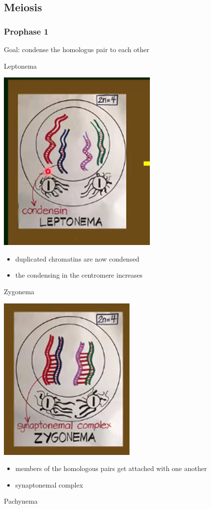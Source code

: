 \documentclass{article}
\begin{document}
\subsection*{Meiosis}
\subsubsection*{Prophase 1}
Goal: condense the homologus pair to each other


Leptonema


\includegraphics*[scale=0.9]{leptonema.png}
\begin{itemize}
    \item duplicated chromatins are now condensed
    \item the condensing in the centromere increases
\end{itemize}
Zygonema


\includegraphics*[scale=0.9]{zygonema.png}
\begin{itemize}
    \item members of the homologous pairs get attached with one another
    \item synaptonemal complex
\end{itemize}
Pachynema
\end{document}
